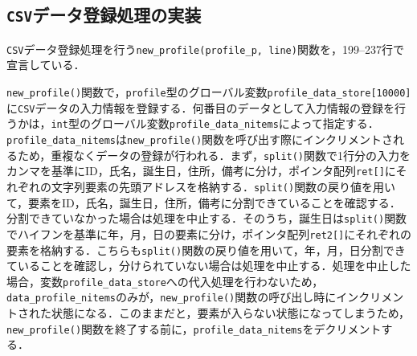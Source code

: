 \subsection{\texttt{CSV}データ登録処理の実装}

\verb|CSV|データ登録処理を行う\verb|new_profile(profile_p, line)|関数を，199--237行で宣言している．

\verb|new_profile()|関数で，\verb|profile|型のグローバル変数\verb|profile_data_store[10000]|に\verb|CSV|データの入力情報を登録する．何番目のデータとして入力情報の登録を行うかは，\verb|int|型のグローバル変数\verb|profile_data_nitems|によって指定する．\verb|profile_data_nitems|は\verb|new_profile()|関数を呼び出す際にインクリメントされるため，重複なくデータの登録が行われる．まず，\verb|split()|関数で1行分の入力をカンマを基準にID，氏名，誕生日，住所，備考に分け，ポインタ配列\verb|ret[]|にそれぞれの文字列要素の先頭アドレスを格納する．\verb|split()|関数の戻り値を用いて，要素をID，氏名，誕生日，住所，備考に分割できていることを確認する．分割できていなかった場合は処理を中止する．そのうち，誕生日は\verb|split()|関数でハイフンを基準に年，月，日の要素に分け，ポインタ配列\verb|ret2[]|にそれぞれの要素を格納する．こちらも\verb|split()|関数の戻り値を用いて，年，月，日分割できていることを確認し，分けられていない場合は処理を中止する．処理を中止した場合，変数\verb|profile_data_store|への代入処理を行わないため，\verb|data_profile_nitems|のみが，\verb|new_profile()|関数の呼び出し時にインクリメントされた状態になる．このままだと，要素が入らない状態になってしまうため，\verb|new_profile()|関数を終了する前に，\verb|profile_data_nitems|をデクリメントする．

